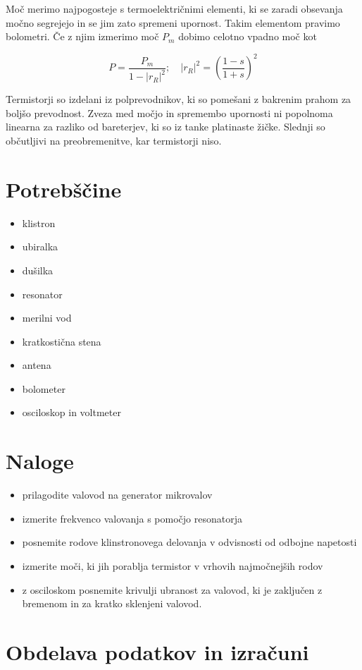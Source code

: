 \documentclass[11pt]{article}
\begin{document}
Moč merimo najpogosteje s termoelektričnimi elementi, ki se zaradi obsevanja močno segrejejo in se jim zato spremeni upornost. Takim elementom pravimo bolometri. Če z njim izmerimo moč \(P_m\) dobimo celotno vpadno moč kot

\begin{equation}
\label{eq:4}
P = \frac{P_m}{1 - \left| r_R \right| ^2}; \quad \left| r_R \right|^2 = (\frac{1 - s}{1 + s}) ^2
\end{equation}

Termistorji so izdelani iz polprevodnikov, ki so pomešani z bakrenim prahom za boljšo prevodnost. Zveza med močjo in spremembo upornosti ni popolnoma linearna za razliko od bareterjev, ki so iz tanke platinaste žičke. Slednji so občutljivi na preobremenitve, kar termistorji niso.
\section{Potrebščine}\label{sec:org0f556ee}
\begin{itemize}
\item klistron
\item ubiralka
\item dušilka
\item resonator
\item merilni vod
\item kratkostična stena
\item antena
\item bolometer
\item osciloskop in voltmeter
\end{itemize}
\section{Naloge}\label{sec:orgc5da1f2}
\begin{itemize}
\item prilagodite valovod na generator mikrovalov
\item izmerite frekvenco valovanja s pomočjo resonatorja
\item posnemite rodove klinstronovega delovanja v odvisnosti od odbojne napetosti
\item izmerite moči, ki jih porablja termistor v vrhovih najmočnejših rodov
\item z osciloskom posnemite krivulji ubranost za valovod, ki je zaključen z bremenom in za kratko sklenjeni valovod.
\end{itemize}
\section{Obdelava podatkov in izračuni}\label{sec:orgb6430b5}
\end{document}
